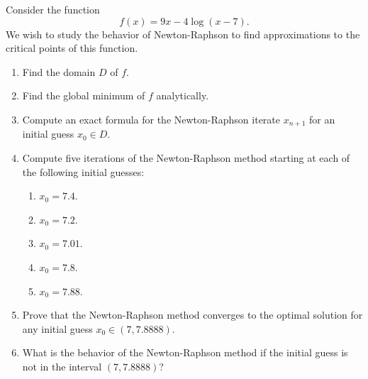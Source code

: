 \begin{problem}
Consider the function 
\begin{equation*}
f(x) = 9x -4\log(x-7).
\end{equation*}
We wish to study the behavior of Newton-Raphson to find approximations to the critical points of this function.
\begin{enumerate}
	\item Find the domain $D$ of $f$.
	\item Find the global minimum of $f$ analytically.
	\item Compute an exact formula for the Newton-Raphson iterate $x_{n+1}$ for an initial guess $x_0 \in D$.
	\item Compute five iterations of the Newton-Raphson method starting at each of the following initial guesses:
	\begin{enumerate}
		\item $x_0 = 7.4$.
		\item $x_0 = 7.2$.
		\item $x_0 = 7.01$.
		\item $x_0 = 7.8$.
		\item $x_0 = 7.88$.
	\end{enumerate}
	\item Prove that the Newton-Raphson method converges to the optimal solution for any initial guess $x_0 \in (7,7.8888)$.
	\item What is the behavior of the Newton-Raphson method if the initial guess is not in the interval $(7,7.8888)$?
\end{enumerate}
\end{problem}

